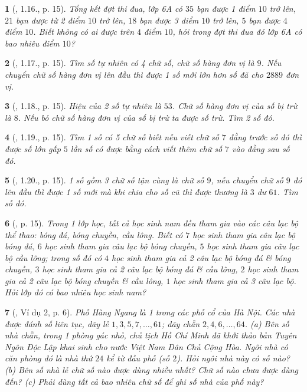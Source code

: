 \documentclass{article}
\newtheorem{baitoan}{}
\begin{document}
\begin{baitoan}[\cite{Binh_boi_duong_Toan_6_tap_1}, 1.16., p. 15]
	Tổng kết đợt thi đua, lớp 6A có $35$ bạn được 1 điểm $10$ trở lên, $21$ bạn được từ 2 điểm $10$ trở lên, $18$ bạn được 3 điểm $10$ trở lên, $5$ bạn được $4$ điểm $10$. Biết không có ai được trên $4$ điểm $10$, hỏi trong đợt thi đua đó lớp 6A có bao nhiêu điểm $10$?
\end{baitoan}

\begin{baitoan}[\cite{Binh_boi_duong_Toan_6_tap_1}, 1.17., p. 15]
	Tìm số tự nhiên có 4 chữ số, chữ số hàng đơn vị là $9$. Nếu chuyển chữ số hàng đơn vị lên đầu thì được 1 số mới lớn hơn số đã cho $2889$ đơn vị.
\end{baitoan}

\begin{baitoan}[\cite{Binh_boi_duong_Toan_6_tap_1}, 1.18., p. 15]
	Hiệu của 2 số tự nhiên là $53$. Chữ số hàng đơn vị của số bị trừ là $8$. Nếu bỏ chữ số hàng đơn vị của số bị trừ ta được số trừ. Tìm 2 số đó.
\end{baitoan}

\begin{baitoan}[\cite{Binh_boi_duong_Toan_6_tap_1}, 1.19., p. 15]
	Tìm 1 số có 5 chữ số biết nếu viết chữ số $7$ đằng trước số đó thì được số lớn gấp $5$ lần số có được bằng cách viết thêm chữ số $7$ vào đằng sau số đó.
\end{baitoan}

\begin{baitoan}[\cite{Binh_boi_duong_Toan_6_tap_1}, 1.20., p. 15]
	1 số gồm 3 chữ số tận cùng là chữ số $9$, nếu chuyển chữ số $9$ đó lên đầu thì được 1 số mới mà khi chia cho số cũ thì được thương là $3$ dư $61$. Tìm số đó.
\end{baitoan}

\begin{baitoan}[\cite{Binh_boi_duong_Toan_6_tap_1}, p. 15]
	Trong 1 lớp học, tất cả học sinh nam đều tham gia vào các câu lạc bộ thể thao: bóng đá, bóng chuyền, cầu lông. Biết có $7$ học sinh tham gia câu lạc bộ bóng đá, $6$ học sinh tham gia câu lạc bộ bóng chuyền, $5$ học sinh tham gia câu lạc bộ cầu lông; trong số đó có $4$ học sinh tham gia cả 2 câu lạc bộ bóng đá \& bóng chuyền, $3$ học sinh tham gia cả 2 câu lạc bộ bóng đá \& cầu lông, $2$ học sinh tham gia cả 2 câu lạc bộ bóng chuyền \& cầu lông, $1$ học sinh tham gia cả 3 câu lạc bộ. Hỏi lớp đó có bao nhiêu học sinh nam?
\end{baitoan}

\begin{baitoan}[\cite{Tuyen_Toan_6}, Ví dụ 2, p. 6]
	Phố Hàng Ngang là 1 trong các phố cổ của Hà Nội. Các nhà được đánh số liên tục, dãy lẻ $1,3,5,7,\ldots,61$; dãy chẵn $2,4,6,\ldots,64$. (a) Bên số nhà chẵn, trong 1 phòng gác nhỏ, chủ tịch Hồ Chí Minh đã khởi thảo bản Tuyên Ngôn Độc Lập khai sinh cho nước Việt Nam Dân Chủ Cộng Hòa. Ngôi nhà có căn phòng đó là nhà thứ $24$ kể từ đầu phố (số $2$). Hỏi ngôi nhà này có số nào? (b) Bên số nhà lẻ chữ số nào được dùng nhiều nhất? Chữ số nào chưa được dùng đến? (c) Phải dùng tất cả bao nhiêu chữ số để ghi số nhà của phố này?
\end{baitoan}
\end{document}
